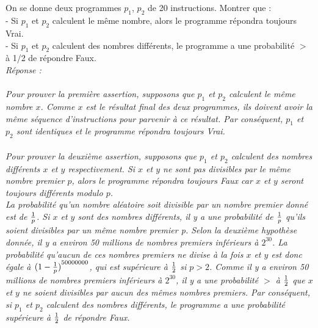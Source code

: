 \documentclass[a4paper,11pt]{article}
\begin{document}
        \subsection{}\label{subsec:Q7}
        On se donne deux programmes $p_1$, $p_2$ de 20 instructions. Montrer que :\\
- Si $p_1$ et $p_2$ calculent le même nombre, alors le programme répondra toujours Vrai.\\
- Si $p_1$ et $p_2$ calculent des nombres différents, le programme a une probabilité $>$ à 1/2 de répondre Faux.\\\textit{Réponse :\\\\
            Pour prouver la première assertion, supposons que $p_1$ et $p_2$ calculent le même nombre $x$. Comme $x$ est le résultat final des deux programmes, ils doivent avoir la même séquence d'instructions pour parvenir à ce résultat. Par conséquent, $p_1$ et $p_2$ sont identiques et le programme répondra toujours Vrai.\\\\
Pour prouver la deuxième assertion, supposons que $p_1$ et $p_2$ calculent des nombres différents $x$ et $y$ respectivement. Si $x$ et $y$ ne sont pas divisibles par le même nombre premier $p$, alors le programme répondra toujours Faux car $x$ et $y$ seront toujours différents modulo $p$. \\La probabilité qu'un nombre aléatoire soit divisible par un nombre premier donné est de $1\over p$. Si $x$ et $y$ sont des nombres différents, il y a une probabilité de $1\over p$ qu'ils soient divisibles par un même nombre premier p. Selon la deuxième hypothèse donnée, il y a environ 50 millions de nombres premiers inférieurs à $2^{30}$. La probabilité qu'aucun de ces nombres premiers ne divise à la fois $x$ et $y$ est donc égale à ${(1 - {1\over p})}^{50000000}$, qui est supérieure à $1 \over 2$ si $p>2$. Comme il y a environ 50 millions de nombres premiers inférieurs à $2^{30}$, il y a une probabilité $>$ à $1 \over 2$ que $x$ et $y$ ne soient divisibles par aucun des mêmes nombres premiers. Par conséquent, si $p_1$ et $p_2$ calculent des nombres différents, le programme a une probabilité supérieure à $1 \over 2$ de répondre Faux.}


    
\end{document}
